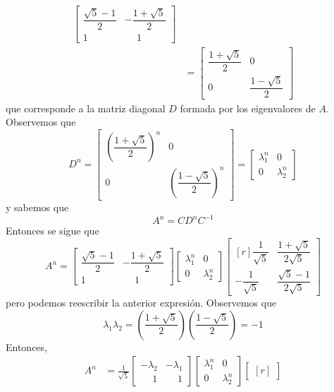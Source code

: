 \begin{example}
\begin{align*}
\begin{bmatrix}
            \dfrac{\sqrt{5} - 1}{2} & -\dfrac{1 + \sqrt{5}}{2} \\[3mm]
            1 & \phantom{-} 1
        \end{bmatrix} \\
        & = \begin{bmatrix}
            \dfrac{1 + \sqrt{5}}{2} & 0 \\[2mm]
            0 & \dfrac{1 - \sqrt{5}}{2}
        \end{bmatrix}
    \end{align*}
    que corresponde a la matriz diagonal $D$ formada por los eigenvalores de $A$. Observemos que
    $$D^n = \begin{bmatrix}
        \left( \dfrac{1 + \sqrt{5}}{2} \right)^n & 0 \\[2mm]
        0 & \left( \dfrac{1 - \sqrt{5}}{2} \right)^n
    \end{bmatrix} = \begin{bmatrix}
        \lambda_1^n & 0 \\
        0 & \lambda_2^n
    \end{bmatrix}$$
    y sabemos que
    $$A^n = CD^nC^{-1}$$
    Entonces se sigue que
    $$A^n = \begin{bmatrix} \dfrac{\sqrt{5} - 1}{2} & -\dfrac{1 + \sqrt{5}}{2} \\[3mm] 1 & \phantom{-} 1 \end{bmatrix} \begin{bmatrix} \lambda_1^n & 0 \\ 0 & \lambda_2^n \end{bmatrix} \begin{bmatrix*}[r] \dfrac{1}{\sqrt{5}} & \dfrac{1 + \sqrt{5}}{2\sqrt{5}} \\[3mm] -\dfrac{1}{\sqrt{5}} & \dfrac{\sqrt{5} - 1}{2\sqrt{5}} \end{bmatrix*}$$
    pero podemos reescribir la anterior expresión. Observemos que
    $$\lambda_1 \lambda_2 = \left( \frac{1 + \sqrt{5}}{2} \right) \left( \frac{1 - \sqrt{5}}{2} \right) = -1$$
    Entonces,
    \begin{align*}
        A^n & = \frac{1}{\sqrt{5}} \begin{bmatrix}
            -\lambda_2 & -\lambda_1 \\
            \phantom{-} 1 & \phantom{-} 1
        \end{bmatrix} \begin{bmatrix}
            \lambda_1^n & 0 \\
            0 & \lambda_2^n
        \end{bmatrix} \begin{bmatrix*}[r]

\end{bmatrix*}
\end{align*}
\end{example}
